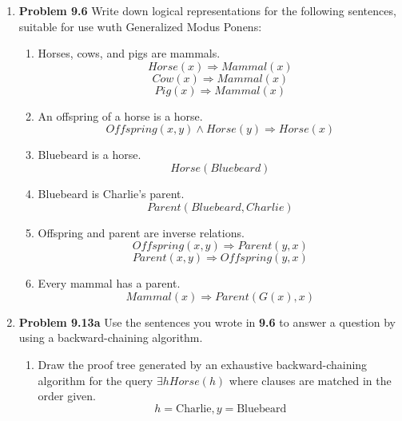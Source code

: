\documentclass[10pt]{article}
\begin{document}
\begin{enumerate}
\item \textbf{Problem 9.6} Write down logical representations for the following sentences, suitable for use wuth Generalized Modus Ponens:
  \begin{enumerate}
  \item Horses, cows, and pigs are mammals.
    \[ Horse(x) \Rightarrow Mammal(x) \]
    \[ Cow(x) \Rightarrow Mammal(x) \]
    \[ Pig(x) \Rightarrow Mammal(x) \]
  \item An offspring of a horse is a horse.
    \[ Offspring(x,y) \wedge Horse (y) \Rightarrow Horse(x) \]
  \item Bluebeard is a horse.
    \[ Horse (Bluebeard) \]
  \item Bluebeard is Charlie's parent.
    \[Parent (Bluebeard, Charlie) \]
  \item Offspring and parent are inverse relations.
    \[ Offspring (x,y) \Rightarrow Parent(y,x) \]
    \[ Parent(x,y) \Rightarrow Offspring(y,x) \]
  \item Every mammal has a parent.
    \[Mammal(x) \Rightarrow Parent(G(x),x) \]
  \end{enumerate}

\item \textbf{Problem 9.13a} Use the sentences you wrote in \textbf{9.6} to answer a question by using a backward-chaining algorithm.
  \begin{enumerate}
  \item Draw the proof tree generated by an exhaustive backward-chaining algorithm for the query $\exists h Horse(h)$ where clauses are matched in the order given.
    \[ h = \textrm{Charlie}, y = \textrm{Bluebeard} \]
    \end{enumerate}

\end{enumerate}
\end{document}
